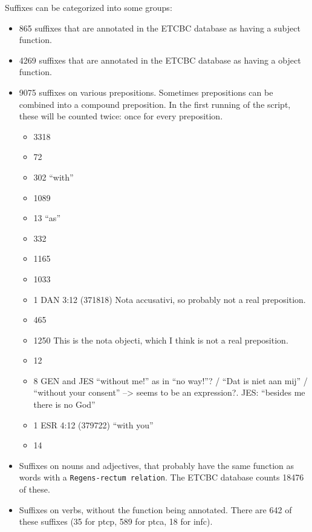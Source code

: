 \documentclass{report}
\newcommand{\mi}[1]{\lstinline{#1}}
\begin{document}
Suffixes can be categorized into some groups:
\begin{itemize}
\item 865 suffixes that are annotated in the ETCBC database as having a subject function. 
\item 4269 suffixes that are annotated in the ETCBC database as having a object function. 
\item 9075 suffixes on various prepositions. Sometimes prepositions can be combined into a compound preposition. In the first running of the script, these will be counted twice: once for every preposition.
\begin{itemize}
\item        {} 3318
\item        {} 72
\item        {} 302 ``with''
\item        {} 1089
\item        {} 13   ``as''
\item        {} 332
\item        {} 1165
\item        {} 1033
\item        {} 1  DAN 3:12 (371818) Nota accusativi, so probably not a real preposition.
\item        {} 465
\item        {} 1250 This is the nota objecti, which I think is not a real preposition.
\item        {} 12
\item        {} 8 GEN and JES ``without me!'' as in ``no way!''? / ``Dat is niet aan mij'' / ``without your consent'' --> seems to be an expression?. JES: ``besides me there is no God''
\item        {} 1   ESR 4:12 (379722) ``with you''
\item        {} 14
\end{itemize}
\item Suffixes on nouns and adjectives, that probably have the same function as words with a \mi{Regens-rectum relation}. The ETCBC database counts 18476 of these.
\item Suffixes on verbs, without the function being annotated. There are 642 of these suffixes (35 for ptcp, 589 for ptca, 18 for infc).
\end{itemize}
\end{document}
